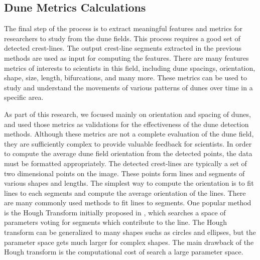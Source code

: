 \subsection{Dune Metrics Calculations} \label{subsec:dune-field-metrics}
The final step of the process is to extract meaningful features and metrics for researchers to study from the dune fields. This process requires a good set of detected crest-lines. The output crest-line segments extracted in the previous methods are used as input for computing the features. There are many features metrics of interests to scientists in this field, including dune spacings, orientation, shape, size, length, bifurcations, and many more. These metrics can be used to study and understand the movements of various patterns of dunes over time in a specific area.

As part of this research, we focused mainly on orientation and spacing of dunes, and used those metrics as validations for the effectiveness of the dune detection methods. Although these metrics are not a complete evaluation of the dune field, they are sufficiently complex to provide valuable feedback for scientists. In order to compute the average dune field orientation from the detected points, the data must be formatted appropriately. The detected crest-lines are typically a set of two dimensional points on the image. These points form lines and segments of various shapes and lengths. The simplest way to compute the orientation is to fit lines to each segments and compute the average orientation of the lines. There are many commonly used methods to fit lines to segments. One popular method is the Hough Transform initially proposed in \cite{hough-1959-paper,hough-1962-patent,hough-duda-1972-paper}, which searches a space of parameters voting for segments which contribute to the line. The Hough transform can be generalized to many shapes suchs as circles and ellipses, but the parameter space gets much larger for complex shapes. The main drawback of the Hough transform is the computational cost of search a large parameter space.

